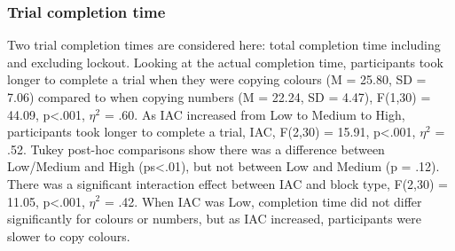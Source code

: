 \subsubsection{Trial completion time}
Two trial completion times are considered here: total completion time including and excluding lockout. 
Looking at the actual completion time, participants took longer to complete a trial when they were copying colours (M = 25.80, SD = 7.06) compared to when copying numbers (M = 22.24, SD = 4.47), F(1,30) = 44.09, p<.001, $\eta^2$ = .60. As IAC increased from Low to Medium to High, participants took longer to complete a trial, IAC, F(2,30) = 15.91, p<.001, $\eta^2$ = .52. Tukey post-hoc comparisons show there was a difference between Low/Medium and High (ps<.01), but not between Low and Medium (p = .12). There was a significant interaction effect between IAC and block type, F(2,30) = 11.05, p<.001, $\eta^2$ = .42. When IAC was Low, completion time did not differ significantly for colours or numbers, but as IAC increased, participants were slower to copy colours.

